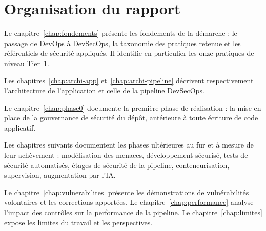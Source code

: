 \section{Organisation du rapport}

Le chapitre~\ref{chap:fondements} présente les fondements de la démarche : le
passage de DevOps à DevSecOps, la taxonomie des pratiques retenue et les
référentiels de sécurité appliqués. Il identifie en particulier les onze
pratiques de niveau Tier~1.

Les chapitres~\ref{chap:archi-app} et~\ref{chap:archi-pipeline} décrivent
respectivement l'architecture de l'application et celle de la pipeline
DevSecOps.

Le chapitre~\ref{chap:phase0} documente la première phase de réalisation : la
mise en place de la gouvernance de sécurité du dépôt, antérieure à toute
écriture de code applicatif.

Les chapitres suivants documentent les phases ultérieures au fur et à mesure de
leur achèvement : modélisation des menaces, développement sécurisé, tests de
sécurité automatisés, étages de sécurité de la pipeline, conteneurisation,
supervision, augmentation par l'IA.

Le chapitre~\ref{chap:vulnerabilites} présente les démonstrations de
vulnérabilités volontaires et les corrections apportées. Le
chapitre~\ref{chap:performance} analyse l'impact des contrôles sur la
performance de la pipeline. Le chapitre~\ref{chap:limites} expose les limites du
travail et les perspectives.
